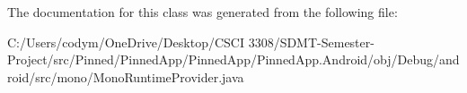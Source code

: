 The documentation for this class was generated from the following file\+:\begin{DoxyCompactItemize}
\item 
C\+:/\+Users/codym/\+One\+Drive/\+Desktop/\+C\+S\+C\+I 3308/\+S\+D\+M\+T-\/\+Semester-\/\+Project/src/\+Pinned/\+Pinned\+App/\+Pinned\+App/\+Pinned\+App.\+Android/obj/\+Debug/android/src/mono/Mono\+Runtime\+Provider.\+java\end{DoxyCompactItemize}
